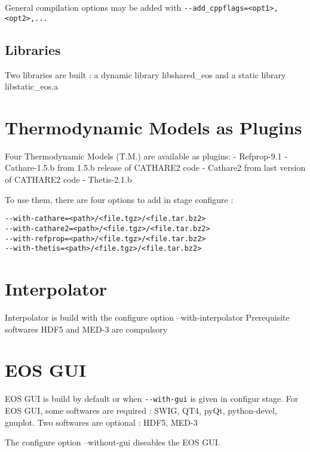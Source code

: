 \documentclass[12pt,a4paper]{article}
\begin{document}
General compilation options may be added with  \verb|--add_cppflags=<opt1>,<opt2>,...|



\subsection {Libraries}
Two libraries are built : a dynamic library libshared\_eos and
a static library libstatic\_eos.a


\section {Thermodynamic Models as Plugins}
Four Thermodynamic Models (T.M.) are available as plugins:
- Refprop-9.1
- Cathare-1.5.b  from  1.5.b release of CATHARE2 code
- Cathare2       from  last version  of CATHARE2 code
- Thetis-2.1.b

To use them, there are four options to add in stage configure :
\begin{verbatim}
--with-cathare=<path>/<file.tgz>/<file.tar.bz2>
--with-cathare2=<path>/<file.tgz>/<file.tar.bz2>
--with-refprop=<path>/<file.tgz>/<file.tar.bz2>
--with-thetis=<path>/<file.tgz>/<file.tar.bz2>
\end{verbatim}



\section {Interpolator}

Interpolator is build with the configure option --with-interpolator
Prerequisite softwares HDF5 and MED-3 are compulsory


\section {EOS GUI}

EOS GUI is build by default or when \verb|--with-gui| is given in configur stage.
For EOS GUI, some softwares are required : SWIG, QT4, pyQt, python-devel,
gnuplot. Two softwares are optional : HDF5, MED-3

The configure option  --without-gui  diseables the EOS GUI.
\end{document}
